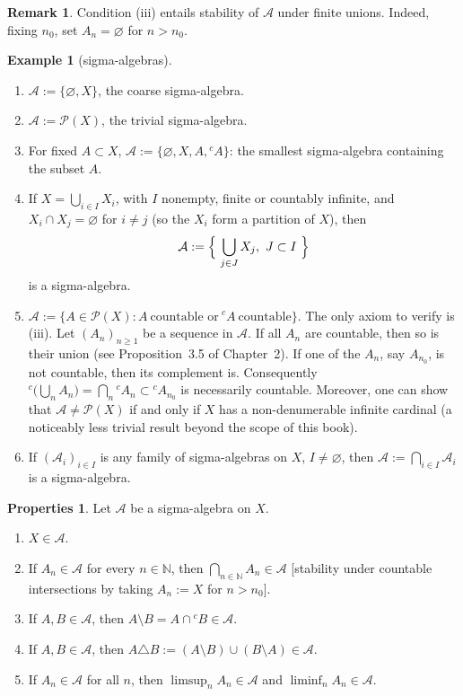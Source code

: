 \documentclass[11pt]{article}
\theoremstyle{definition}
\newtheorem{example}{Example}[section]
\newtheorem{remark}{Remark}[section]
\newtheorem{properties}{Properties}[section]
\begin{document}
\begin{remark} 
Condition (iii) entails stability of $\mathcal A$ under finite unions. Indeed, fixing $n_0$, set $A_n=\varnothing$ for $n>n_0$.
\end{remark}

\begin{example}[sigma-algebras]

\begin{enumerate}[leftmargin=1.5em,label=\arabic*.]
\item $\mathcal A:=\{\varnothing,X\}$, the coarse sigma-algebra.
\item $\mathcal A:=\mathcal P(X)$, the trivial sigma-algebra.
\item For fixed $A\subset X$, $\mathcal A:=\{\varnothing,X,A,{}^{c}\!A\}$: the smallest sigma-algebra containing the subset $A$.
\item If $X=\bigcup_{i\in I} X_i$, with $I$ nonempty, finite or countably infinite, and $X_i\cap X_j=\varnothing$ for $i\ne j$ (so the $X_i$ form a partition of $X$), then
\[
\mathcal A:=\Bigl\{\ \bigcup_{j\in J} X_j,\ J\subset I\ \Bigr\}
\]
is a sigma-algebra.
\item $\mathcal A:=\{A\in\mathcal P(X): A\ \text{countable or}\ {}^{c}\!A\ \text{countable}\}$.
The only axiom to verify is (iii). Let $(A_n)_{n\ge1}$ be a sequence in $\mathcal A$.
If all $A_n$ are countable, then so is their union (see Proposition~3.5 of Chapter~2).
If one of the $A_n$, say $A_{n_0}$, is not countable, then its complement is.
Consequently ${}^{c}\!\bigl(\bigcup_n A_n\bigr)=\bigcap_n {}^{c}\!A_n\subset {}^{c}\!A_{n_0}$ is necessarily countable.
Moreover, one can show that $\mathcal A\ne\mathcal P(X)$ if and only if $X$ has a non-denumerable infinite cardinal (a noticeably less trivial result beyond the scope of this book).
\item If $(\mathcal A_i)_{i\in I}$ is any family of sigma-algebras on $X$, $I\ne\varnothing$, then $\displaystyle \mathcal A:=\bigcap_{i\in I}\mathcal A_i$ is a sigma-algebra.
\end{enumerate}
\end{example}

\begin{properties}
Let $\mathcal A$ be a sigma-algebra on $X$.
\begin{enumerate}[label=(\alph*),leftmargin=2em]
\item $X\in\mathcal A$.
\item If $A_n\in\mathcal A$ for every $n\in\mathbb N$, then $\displaystyle \bigcap_{n\in\mathbb N} A_n\in\mathcal A$ \hfill[stability under countable intersections by taking $A_n:=X$ for $n>n_0$].
\item If $A,B\in\mathcal A$, then $A\setminus B=A\cap{}^{c}\!B\in\mathcal A$.
\item If $A,B\in\mathcal A$, then $A\triangle B:=(A\setminus B)\cup(B\setminus A)\in\mathcal A$.
\item If $A_n\in\mathcal A$ for all $n$, then $\limsup_{n} A_n\in\mathcal A$ and $\liminf_{n} A_n\in\mathcal A$.
\end{enumerate}
	
\end{properties}
\end{document}
